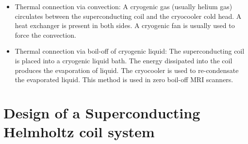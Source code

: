 \documentclass{ws-jmrr}
\begin{document}
\begin{multicols}{2}
\begin{itemize}[leftmargin=*]
\item Thermal connection via convection: A cryogenic gas (usually helium gas) circulates between the superconducting coil and the cryocooler cold head. A heat exchanger is present in both sides. A cryogenic fan is usually used to force the convection.
\item  Thermal connection via boil-off of cryogenic liquid: The superconducting coil is placed into a cryogenic liquid bath. The energy dissipated into the coil produces the evaporation of liquid. The cryocooler is used to re-condensate the evaporated liquid. This method is used in zero boil-off MRI scanners.
\end{itemize}

\section{Design of a Superconducting Helmholtz coil system}

\end{multicols}
\end{document}
